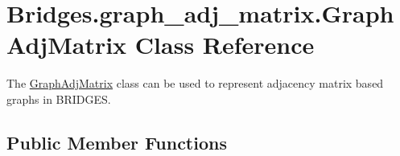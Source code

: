 \hypertarget{class_bridges_1_1graph__adj__matrix_1_1_graph_adj_matrix}{}\section{Bridges.\+graph\+\_\+adj\+\_\+matrix.\+Graph\+Adj\+Matrix Class Reference}
\label{class_bridges_1_1graph__adj__matrix_1_1_graph_adj_matrix}


The \mbox{\hyperlink{class_bridges_1_1graph__adj__matrix_1_1_graph_adj_matrix}{Graph\+Adj\+Matrix}} class can be used to represent adjacency matrix based graphs in B\+R\+I\+D\+G\+ES.  


\subsection*{Public Member Functions}
